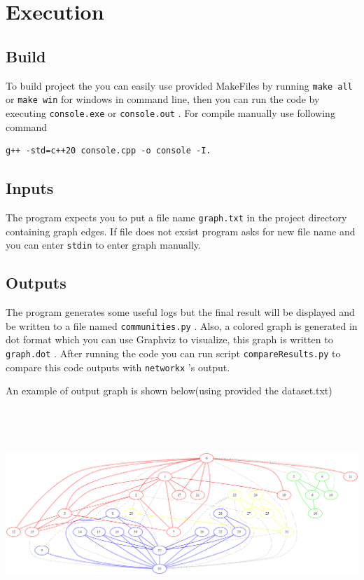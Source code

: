 \documentclass{article}
\begin{document}
\newcommand{\bash}[1]{\colorbox{gray!30}{\lstinline{#1}} }

\newpage
\section*{Execution}
\subsection*{Build}
To build project the you can easily use provided MakeFiles by running \bash{make all} or \bash{make win} for windows  in command line, then you can run the code by executing \bash{console.exe} or \bash{console.out}. For compile manually use following command
\begin{lstlisting}
g++ -std=c++20 console.cpp -o console -I.
\end{lstlisting}

\subsection*{Inputs}
The program expects you to put a file name \bash{graph.txt} in the project directory containing graph edges. If file does not exsist program asks for new file name and you can enter \bash{stdin} to enter graph manually.

\subsection*{Outputs}
The program generates some useful logs but the final result will be displayed and be written to a file named \bash{communities.py}. Also, a colored graph is generated in dot format which you can use Graphviz to visualize, this graph is written to \bash{graph.dot}. After running the code you can run script \bash{compareResults.py} to compare this code outputs with \bash{networkx}'s output.

An example of output graph is shown below(using provided the dataset.txt)

\begin{center}
\includegraphics[height=8cm, width=\linewidth]{graphviz}
\end{center}
\end{document}
